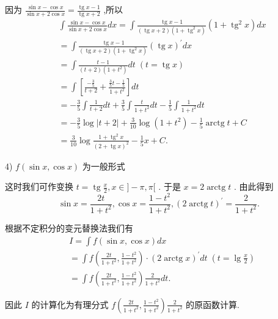 因为 $\frac{\sin x - \cos x}{\sin x + 2\cos x} = \frac{\operatorname{tg}x - 1}{\operatorname{tg}x + 2}$ ,所以
\begin{align*}
	&\int \frac{\sin x - \cos x}{\sin x + 2\cos x}{dx} = \int \frac{\operatorname{tg}x - 1}{\left( {\operatorname{tg}x + 2}\right) \left( {1 + {\operatorname{tg}}^{2}x}\right) }\left( {1 + {\operatorname{tg}}^{2}x}\right) {dx}\\
	&= \int \frac{\operatorname{tg}x - 1}{\left( {\operatorname{tg}x + 2}\right) \left( {1 + {\operatorname{tg}}^{2}x}\right) }{\left( \operatorname{tg}x\right) }^{\prime }{dx}\\
	&= \int \frac{t - 1}{\left( {t + 2}\right) \left( {1 + {t}^{2}}\right) }{dt}\;\left( {t = \operatorname{tg}x}\right)\\
	&= \int \left\lbrack  {\frac{-\frac{3}{5}}{t + 2} + \frac{\frac{3}{5}t - \frac{1}{5}}{1 + {t}^{2}}}\right\rbrack  {dt}\\
	&=  - \frac{3}{5}\int \frac{1}{t + 2}{dt} + \frac{3}{5}\int \frac{t}{1 + {t}^{2}}{dt} - \frac{1}{5}\int \frac{1}{1 + {t}^{2}}{dt}\\
	&=  - \frac{3}{5}\log \left| {t + 2}\right|  + \frac{3}{10}\log \left( {1 + {t}^{2}}\right)  - \frac{1}{5}\operatorname{arctg}t + C\\
	&= \frac{3}{10}\log \frac{1 + {\operatorname{tg}}^{2}x}{{\left( 2 + \operatorname{tg}x\right) }^{2}} - \frac{1}{5}x + C.
\end{align*}

4) $f\left( {\sin x,\cos x}\right)$ 为一般形式

这时我们可作变换 $t = \operatorname{tg}\frac{x}{2},x \in  \rbrack  - \pi ,\pi \lbrack$ . 于是 $x = 2\operatorname{arctg}t$ . 由此得到
$$\sin x = \frac{2t}{1 + {t}^{2}},\cos x = \frac{1 - {t}^{2}}{1 + {t}^{2}},{\left( 2\operatorname{arctg}t\right) }^{\prime } = \frac{2}{1 + {t}^{2}}.$$

根据不定积分的变元替换法我们有
\begin{align*}
	&I = \int f\left( {\sin x,\cos x}\right) {dx}\\
	&= \int f\left( {\frac{2t}{1 + {t}^{2}},\frac{1 - {t}^{2}}{1 + {t}^{2}}}\right)  \cdot  {\left( 2\operatorname{arctg}x\right) }^{\prime }{dt}\;\left( {t = \lg \frac{x}{2}}\right)\\
	&= \int f\left( {\frac{2t}{1 + {t}^{2}},\frac{1 - {t}^{2}}{1 + {t}^{2}}}\right) \frac{2}{1 + {t}^{2}}{dt}.
\end{align*}

因此 $I$ 的计算化为有理分式 $f\left( {\frac{2t}{1 + {t}^{2}},\frac{1 - {t}^{2}}{1 + {t}^{2}}}\right) \frac{2}{1 + {t}^{2}}$ 的原函数计算.

